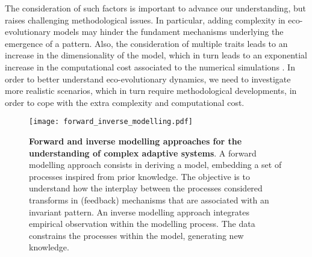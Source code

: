 % 
% 
The consideration of such factors is important to advance our understanding, but raises challenging methodological issues. 
% 
In particular, adding complexity in eco-evolutionary models may hinder the fundament mechanisms underlying the emergence of a pattern.
% 
Also, the consideration of multiple traits leads to an increase in the dimensionality of the model, which in turn leads to an exponential increase in the computational cost associated to the numerical simulations \citep{Bellman1957}.
% 
In order to better understand eco-evolutionary dynamics, we need to investigate more realistic scenarios, which in turn require methodological developments, in order to cope with the extra complexity and computational cost.
% 

\begin{figure}[t]
    \centering
    \texttt{[image: forward\_inverse\_modelling.pdf]}
    \caption{\textbf{Forward and inverse modelling approaches for the understanding of complex adaptive systems}. A forward modelling approach consists in deriving a model, embedding a set of processes inspired from prior knowledge. The objective is to understand how the interplay between the processes considered transforms in (feedback) mechanisms that are associated with an invariant pattern. An inverse modelling approach integrates empirical observation within the modelling process. The data constrains the processes within the model, generating new knowledge. 
    }
    \label{fig:forward_inverse_modelling}
\end{figure}

